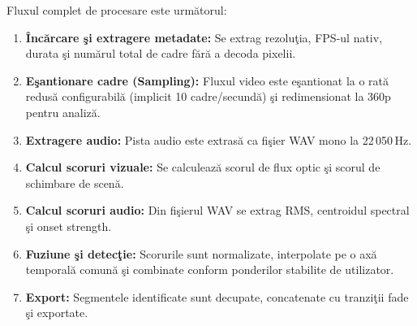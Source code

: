 \documentclass[12pt,a4paper]{article}
\begin{document}
Fluxul complet de procesare este urm\u{a}torul:
\begin{enumerate}[noitemsep]
    \item \textbf{\^{I}nc\u{a}rcare \c{s}i extragere metadate:} Se extrag rezolu\c{t}ia, FPS-ul nativ, durata \c{s}i num\u{a}rul total de cadre f\u{a}r\u{a}{} a decoda pixelii.
    \item \textbf{E\c{s}antionare cadre (Sampling):} Fluxul video este e\c{s}antionat la o rat\u{a}{} redus\u{a}{} configurabil\u{a}{} (implicit 10 cadre/secund\u{a}) \c{s}i redimensionat la 360p pentru analiz\u{a}.
    \item \textbf{Extragere audio:} Pista audio este extras\u{a}{} ca fi\c{s}ier WAV mono la 22\,050\,Hz.
    \item \textbf{Calcul scoruri vizuale:} Se calculeaz\u{a}{} scorul de flux optic \c{s}i scorul de schimbare de scen\u{a}.
    \item \textbf{Calcul scoruri audio:} Din fi\c{s}ierul WAV se extrag RMS, centroidul spectral \c{s}i onset strength.
    \item \textbf{Fuziune \c{s}i detec\c{t}ie:} Scorurile sunt normalizate, interpolate pe o ax\u{a}{} temporal\u{a}{} comun\u{a}{} \c{s}i combinate conform ponderilor stabilite de utilizator.
    \item \textbf{Export:} Segmentele identificate sunt decupate, concatenate cu tranzi\c{t}ii fade \c{s}i exportate.
\end{enumerate}
\end{document}
